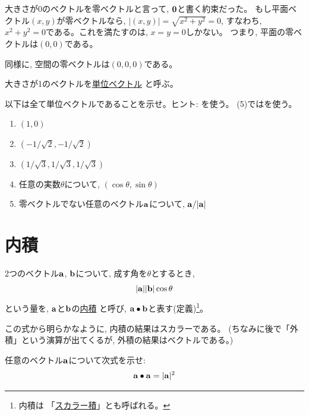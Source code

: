 大きさが0のベクトルを零ベクトルと言って, ${\bf 0}$と書く約束だった。
もし平面ベクトル$(x, y)$が零ベクトルなら, $|(x, y)|=\sqrt{x^2+y^2}=0$, 
すなわち, $x^2+y^2=0$である。これを満たすのは, $x=y=0$しかない。
つまり, 平面の零ベクトルは$(0, 0)$である。

同様に, 空間の零ベクトルは$(0,0,0)$である。\hv

大きさが1のベクトルを\underline{単位ベクトル} 
と呼ぶ。
\hv

\begin{q}\label{q:vect_unit} 
以下は全て単位ベクトルであることを示せ。ヒント: を使う。
(5)ではを使う。
\begin{enumerate}
\item $(1, 0)$
\item $(-1/\sqrt{2}, -1/\sqrt{2})$
\item $(1/\sqrt{3}, 1/\sqrt{3}, 1/\sqrt{3})$
\item 任意の実数$\theta$について, $(\cos\theta, \sin\theta)$
\item 零ベクトルでない任意のベクトル${\bf a}$について, ${\bf a}/|{\bf a}|$
\end{enumerate}
\end{q}
\vv


\section{内積}

2つのベクトル${\bf a}$, ${\bf b}$について, 成す角を$\theta$とするとき, 
\begin{eqnarray}
|{\bf a}||{\bf b}|\cos \theta\label{eq:def_inprod_00}
\end{eqnarray}
という量を, ${\bf a}$と${\bf b}$の\underline{内積} 
と呼び, ${\bf a}\bullet{\bf b}$と表す(定義)\footnote{内積は
「\underline{スカラー積}」とも呼ばれる。}。\hv

この式から明らかなように, 内積の結果はスカラーである。
(ちなみに後で「外積」という演算が出てくるが, 外積の結果はベクトルである。)\hv

\begin{q}\label{q:vect_inprod_length2} 任意のベクトル${\bf a}$について次式を示せ:
\begin{eqnarray}
{\bf a}\bullet{\bf a}=|{\bf a}|^2
\end{eqnarray}
\end{q}\hv

